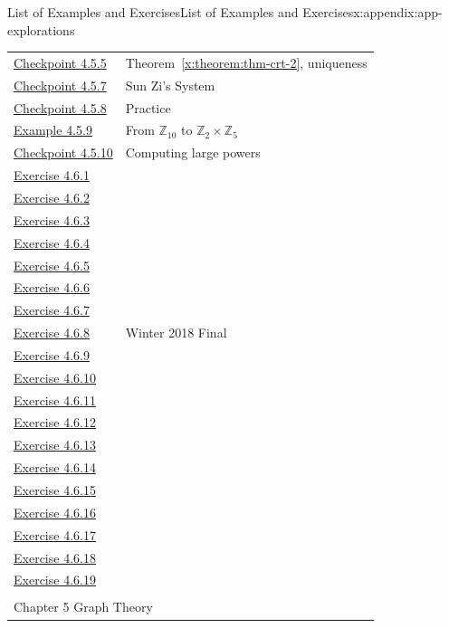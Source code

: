 \documentclass[oneside,10pt,]{book}
\newcommand{\xreffont}{\relax}
\numberwithin{equation}{section}
\begin{document}
\begin{appendixptx}{List of Examples and Exercises}{}{List of Examples and Exercises}{}{}{x:appendix:app-explorations}
\begin{longtable}[l]{ll}
\hyperref[x:exercise:ex-crt-2-prove-uniqueness]{Checkpoint 4.5.5}& Theorem~{\xreffont\ref*{x:theorem:thm-crt-2}}, uniqueness\\
\hyperref[x:exercise:ex-crt-sun-zi]{Checkpoint 4.5.7}& Sun Zi's System\\
\hyperref[x:exercise:ex-crt-n]{Checkpoint 4.5.8}& Practice\\
\hyperref[x:example:eg-crt-bijection]{Example 4.5.9}& From \(\mathbb{Z}_{10}\) to \(\mathbb{Z}_2 \times \mathbb{Z}_5\)\\
\hyperref[x:exercise:ex-crt-bijection-power]{Checkpoint 4.5.10}& Computing large powers\\
\hyperlink{g:exercise:id266130}{Exercise 4.6.1}& \\
\hyperlink{g:exercise:id266405}{Exercise 4.6.2}& \\
\hyperlink{g:exercise:id264849}{Exercise 4.6.3}& \\
\hyperlink{g:exercise:id265064}{Exercise 4.6.4}& \\
\hyperlink{g:exercise:id265314}{Exercise 4.6.5}& \\
\hyperlink{g:exercise:id459892}{Exercise 4.6.6}& \\
\hyperlink{g:exercise:id459993}{Exercise 4.6.7}& \\
\hyperlink{g:exercise:id460000}{Exercise 4.6.8}& Winter 2018 Final\\
\hyperlink{g:exercise:id460075}{Exercise 4.6.9}& \\
\hyperlink{g:exercise:id460147}{Exercise 4.6.10}& \\
\hyperlink{g:exercise:id460261}{Exercise 4.6.11}& \\
\hyperlink{g:exercise:id460386}{Exercise 4.6.12}& \\
\hyperlink{g:exercise:id460380}{Exercise 4.6.13}& \\
\hyperlink{x:exercise:ex-cong-power-two}{Exercise 4.6.14}& \\
\hyperlink{g:exercise:id460573}{Exercise 4.6.15}& \\
\hyperlink{x:exercise:ex-cong-phi-prime-power-prod}{Exercise 4.6.16}& \\
\hyperlink{g:exercise:id460821}{Exercise 4.6.17}& \\
\hyperlink{g:exercise:id460926}{Exercise 4.6.18}& \\
\hyperlink{g:exercise:id460912}{Exercise 4.6.19}& \\
\multicolumn{2}{l}{\null}\\[1.5ex] \multicolumn{2}{l}{\large Chapter 5 Graph Theory}\\[0.5ex]

\end{longtable}
\end{appendixptx}
\end{document}
